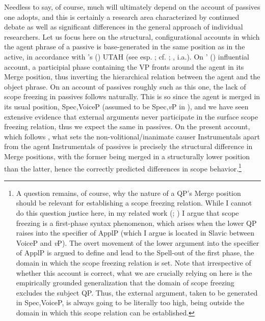 \documentclass[output=paper,colorlinks,citecolor=brown]{langscibook}
\begin{document}
Needless to say, of course, much will ultimately depend on the account of passives one adopts, and this is certainly a research area characterized by continued debate as well as significant differences in the general approach of individual researchers. Let us focus here on the structural, configurational accounts in which the agent phrase of a passive is base-generated in the same position as in the active, in accordance with \citeauthor{Baker1988}'s (\citeyear{Baker1988}) UTAH (see esp. \citealt{Collins2005}; cf. \citealt{Bruening2013}; \citealt{Hallman2021}, i.a.). On \citeauthor{Collins2005}' (\citeyear{Collins2005}) influential account, a participial phase containing the VP fronts around the agent in its Merge position, thus inverting the hierarchical relation between the agent and the object phrase. On an account of passives roughly such as this one, the lack of scope freezing in passives follows naturally. This is so since the agent is merged in its usual position, Spec,VoiceP (assumed to be Spec,\textit{v}P in \citealt{Collins2005}), and we have seen extensive evidence that external arguments never participate in the surface scope freezing relation, thus we expect the same in passives. On the present account, which follows \citet{Lavine2022, Lavine2023}, what sets the non-volitional/inanimate causer Instrumentals apart from the agent Instrumentals of passives is precisely the structural difference in Merge positions, with the former being merged in a structurally lower position than the latter, hence the correctly predicted differences in scope behavior.\footnote{\textrm{A question remains, of course, why the nature of a QP’s Merge position should be relevant for establishing a scope freezing relation. While I cannot do this question justice here, in my related work (\citealt{AntonyukUnderReview}; \citealt{Antonyukinpreparation}) I argue that scope freezing is a first-phase syntax phenomenon, which arises when the lower QP raises into the specifier of ApplP (which I argue is located in Slavic between VoiceP and} \textrm{\textit{v}}\textrm{P). The overt movement of the lower argument into the specifier of ApplP is argued to define and lead to the Spell-out of the first phase, the domain in which the scope freezing relation is set. Note that irrespective of whether this account is correct, what we are crucially relying on here is the empirically grounded generalization that the domain of scope freezing excludes the subject QP. Thus, the external argument, taken to be generated in Spec,VoiceP, is always going to be literally too high, being outside the domain in which this scope relation can be established.} } 
\end{document}
